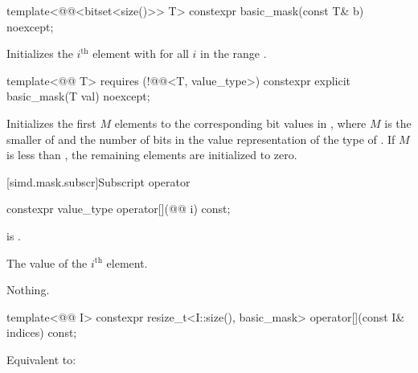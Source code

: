 \begin{itemdecl}
template<@@<bitset<size()>> T>
  constexpr basic_mask(const T& b) noexcept;
\end{itemdecl}

\begin{itemdescr}
\pnum
\effects
Initializes the $i^\text{th}$ element with  for all $i$ in the
range .
\end{itemdescr}

\begin{itemdecl}
template<@@ T>
  requires (!@@<T, value_type>)
  constexpr explicit basic_mask(T val) noexcept;
\end{itemdecl}

\begin{itemdescr}
\pnum
\effects
Initializes the first $M$ elements to the corresponding bit values in
, where $M$ is the smaller of  and the number of bits in
the value representation of the type of . If
$M$ is less than , the remaining elements are initialized to
zero.
\end{itemdescr}

[simd.mask.subscr]{Subscript operator}

\begin{itemdecl}
constexpr value_type operator[](@@ i) const;
\end{itemdecl}

\begin{itemdescr}
\pnum
\expects
{} is .

\pnum
\returns
The value of the $i^\text{th}$ element.

\pnum
\throws
Nothing.
\end{itemdescr}

\begin{itemdecl}
template<@@ I>
  constexpr resize_t<I::size(), basic_mask> operator[](const I& indices) const;
\end{itemdecl}

\begin{itemdescr}
\pnum
\effects
Equivalent to: 
\end{itemdescr}


